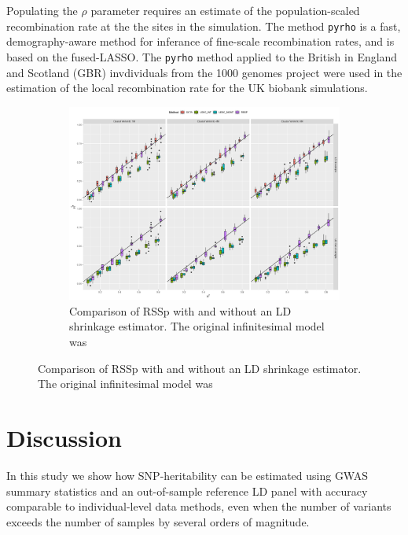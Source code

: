 Populating the \(\rho\) parameter requires an estimate of the population-scaled recombination rate at the the sites in the simulation.  The method \texttt{pyrho} is a fast, demography-aware method for inferance of fine-scale recombination rates, and is based on
the fused-LASSO\cite{Spence_2019}. The \texttt{pyrho} method applied to the British in England and Scotland (GBR) invdividuals from the 1000 genomes project\cite{1kg} were used in the estimation of the local recombination rate for the UK biobank simulations.



  \begin{figure}
      \centering
  \begin{subfigure}[t]{\textwidth}
    \centering
    \includegraphics[width=.9\linewidth]{img/rssp_sparsity.png}
    \caption{Comparison of RSSp with and without an LD shrinkage estimator.  The original infinitesimal model was }\label{fig:rssp_sp_method_comparison}
  \end{subfigure}
\end{figure}





\section{Discussion}\label{sec:orge95691e}


In this study we show how SNP-heritability can be estimated using GWAS summary statistics and an out-of-sample reference LD panel with accuracy comparable to individual-level data methods, even when the number of variants exceeds the number of samples by several orders of magnitude.

